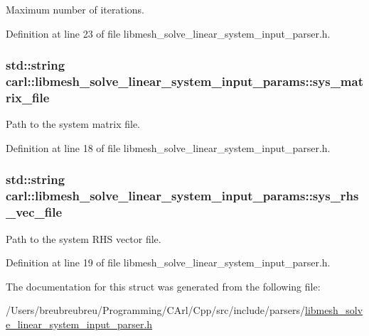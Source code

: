 Maximum number of iterations. 



Definition at line 23 of file libmesh\+\_\+solve\+\_\+linear\+\_\+system\+\_\+input\+\_\+parser.\+h.

\hypertarget{structcarl_1_1libmesh__solve__linear__system__input__params_a2a39165021ba68bc91c857d860539c34}{}
\subsubsection[{sys\+\_\+matrix\+\_\+file}]{\setlength{\rightskip}{0pt plus 5cm}std\+::string carl\+::libmesh\+\_\+solve\+\_\+linear\+\_\+system\+\_\+input\+\_\+params\+::sys\+\_\+matrix\+\_\+file}\label{structcarl_1_1libmesh__solve__linear__system__input__params_a2a39165021ba68bc91c857d860539c34}


Path to the system matrix file. 



Definition at line 18 of file libmesh\+\_\+solve\+\_\+linear\+\_\+system\+\_\+input\+\_\+parser.\+h.

\hypertarget{structcarl_1_1libmesh__solve__linear__system__input__params_ab61ffd0ba104883487ed36c6b5ce9e70}{}
\subsubsection[{sys\+\_\+rhs\+\_\+vec\+\_\+file}]{\setlength{\rightskip}{0pt plus 5cm}std\+::string carl\+::libmesh\+\_\+solve\+\_\+linear\+\_\+system\+\_\+input\+\_\+params\+::sys\+\_\+rhs\+\_\+vec\+\_\+file}\label{structcarl_1_1libmesh__solve__linear__system__input__params_ab61ffd0ba104883487ed36c6b5ce9e70}


Path to the system R\+H\+S vector file. 



Definition at line 19 of file libmesh\+\_\+solve\+\_\+linear\+\_\+system\+\_\+input\+\_\+parser.\+h.



The documentation for this struct was generated from the following file\+:\begin{DoxyCompactItemize}
\item 
/\+Users/breubreubreu/\+Programming/\+C\+Arl/\+Cpp/src/include/parsers/\hyperlink{libmesh__solve__linear__system__input__parser_8h}{libmesh\+\_\+solve\+\_\+linear\+\_\+system\+\_\+input\+\_\+parser.\+h}\end{DoxyCompactItemize}
